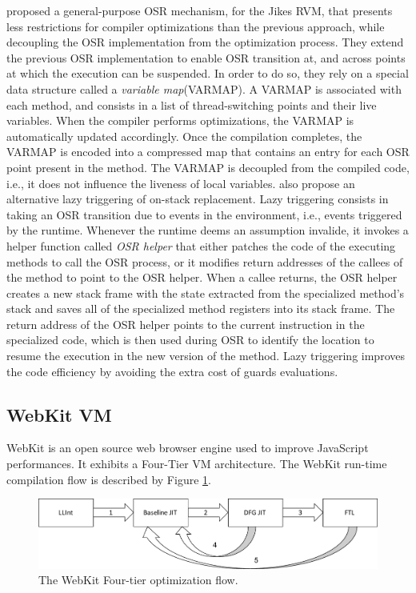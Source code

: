  proposed a general-purpose OSR mechanism, for the Jikes RVM, that presents less restrictions for compiler optimizations than the previous approach, while decoupling the OSR implementation from the optimization process.
They extend the previous OSR implementation\cite{fink2003design} to enable OSR transition at, and across points at which the execution can be suspended.
In order to do so, they rely on a special data structure called a \textit{variable map}(VARMAP).
A VARMAP is associated with each method, and consists in a list of thread-switching points and their live variables.
When the compiler performs optimizations, the VARMAP is automatically updated accordingly.
Once the compilation completes, the VARMAP is encoded into a compressed map that contains an entry for each OSR point present in the method.
The VARMAP is decoupled from the compiled code, i.e., it does not influence the liveness of local variables.
 also propose an alternative lazy triggering of on-stack replacement.
Lazy triggering consists in taking an OSR transition due to events in the environment, i.e., events triggered by the runtime. 
Whenever the runtime deems an assumption invalide, it invokes a helper function called \textit{OSR helper} that either patches the code of the executing methods to call the OSR process, or it modifies return addresses of the callees of the method to point to the OSR helper.
When a callee returns, the OSR helper creates a new stack frame with the state extracted from the specialized method's stack and saves all of the specialized method registers into its stack frame. 
The return address of the OSR helper points to the current instruction in the specialized code, which is then used during OSR to identify the location to resume the execution in the new version of the method.
Lazy triggering improves the code efficiency by avoiding the extra cost of guards evaluations.\\

\subsection{WebKit VM}\label{webkit}

WebKit\cite{WebKitURL} is an open source web browser engine used to improve JavaScript performances.
It exhibits a Four-Tier VM architecture. 
The WebKit run-time compilation flow is described by Figure \ref{FTL}.\\
\begin{figure}[h]
\centering
\includegraphics[scale=0.5]{Figures/FTL}
\decoRule
\caption[The WebKit FTL]{The WebKit Four-tier optimization flow.}
\label{FTL}
\end{figure}
 
